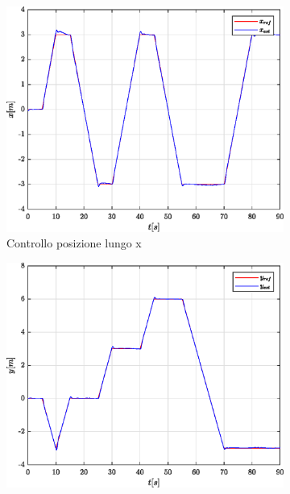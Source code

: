 \begin{figure}
	\centering
	\begin{subfigure}{0.45\textwidth}
		\centering
		\includegraphics[width=1\textwidth]{Simulazioni/Figure/SMC/SNAKE/PositionControlXPos}
		\caption{Controllo posizione lungo x}
		\label{fig:SNAKEerrposxSMC}
	\end{subfigure}
	\hfill
	\begin{subfigure}{0.45\textwidth}
		\centering
		\includegraphics[width=1\textwidth]{Simulazioni/Figure/SMC/SNAKE/PositionControlYPos}

\end{subfigure}
\end{figure}
